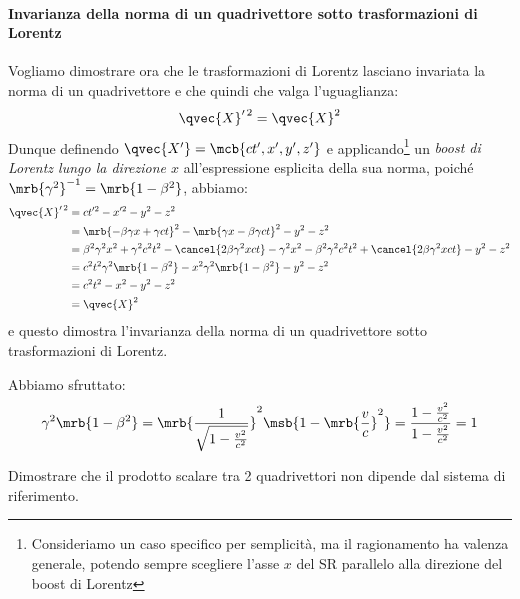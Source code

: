\paragraph{Invarianza della norma di un quadrivettore sotto trasformazioni di
Lorentz}
Vogliamo dimostrare ora che le trasformazioni di Lorentz lasciano invariata
la norma di un quadrivettore e che quindi che valga l'uguaglianza:
\begin{equation}
  \qvec{X}^{\prime\, 2} = \qvec{X}^2
\end{equation}
Dunque definendo $\qvec{X^\prime} = \mcb{ct^\prime, x^\prime, y^\prime,
z^\prime}$ e applicando\footnote{
  Consideriamo un caso specifico per semplicità, ma il ragionamento ha valenza
  generale, potendo sempre scegliere l'asse $x$ del SR parallelo alla direzione
  del boost di Lorentz
} un \textit{boost di Lorentz lungo la direzione $x$} all'espressione
esplicita della sua norma, poiché $\mrb{\gamma^2}^{-1} = \mrb{1-\beta^2}$,
abbiamo:
\begin{align}
    \qvec{X}^{\prime\, 2} 
    &= ct^{\prime 2} - x^{\prime 2} - y^2 - z^2
    \\\notag
    &= \mrb{-\beta\gamma x + \gamma ct}^2 - \mrb{\gamma x - \beta\gamma ct}^2 -
    y^2 - z^2
    \\\notag
    &= \beta^2\gamma^2x^2 + \gamma^2c^2t^2 - \cancel{2\beta\gamma^2xct} 
    - \gamma^2x^2 - \beta^2\gamma^2c^2t^2 + \cancel{2\beta\gamma^2xct} - y^2
    - z^2
    \\\notag
    &= c^2t^2\gamma^2\mrb{1-\beta^2} - x^2\gamma^2\mrb{1-\beta^2} - y^2 - z^2 
    \\\notag
    &= c^2t^2 - x^2 - y^2 - z^2 
    \\\notag
    &= \qvec{X}^2
\end{align}
e questo dimostra l'invarianza della norma di un quadrivettore sotto
trasformazioni di Lorentz.

\begin{note}[]
  Abbiamo sfruttato:
  \begin{equation}
    \gamma^2 \mrb{1 - \beta^2} 
    = \mrb{\frac{1}{\sqrt{1 - \frac{v^2}{c^2}}}}^{2} \msb{{1 -
    \mrb{\frac{v}{c}}^2}}
    = \frac{1 - \frac{v^2}{c^2}}{1 - \frac{v^2}{c^2}}
    = 1
  \end{equation}
\end{note}

\begin{exercise}[Da svolgere]
  Dimostrare che il prodotto scalare tra 2 quadrivettori non dipende dal sistema
  di riferimento.
\end{exercise}
